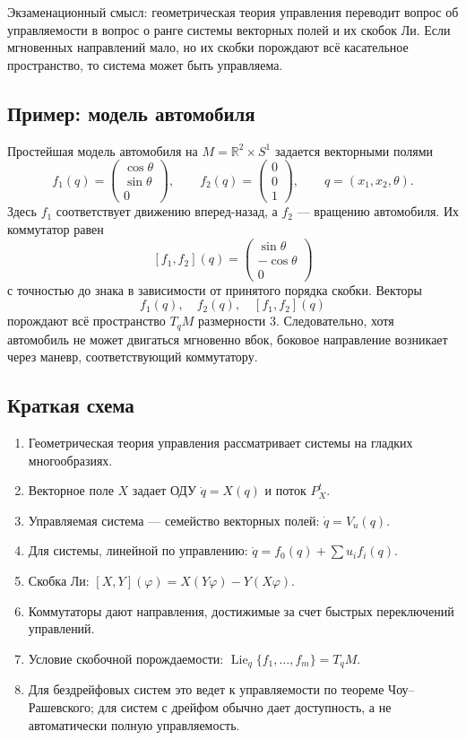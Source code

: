\documentclass[12pt,a4paper]{article}
\newcommand{\Lie}{\operatorname{Lie}}
\begin{document}
Экзаменационный смысл: геометрическая теория управления переводит вопрос об управляемости в вопрос о ранге системы векторных полей и их скобок Ли. Если мгновенных направлений мало, но их скобки порождают всё касательное пространство, то система может быть управляема.

\subsection*{Пример: модель автомобиля}
Простейшая модель автомобиля на $M=\mathbb R^2\times S^1$ задается векторными полями
\[
f_1(q)=
\begin{pmatrix}
\cos\theta\\
\sin\theta\\
0
\end{pmatrix},
\qquad
f_2(q)=
\begin{pmatrix}
0\\
0\\
1
\end{pmatrix},
\qquad q=(x_1,x_2,\theta).
\]
Здесь $f_1$ соответствует движению вперед-назад, а $f_2$ --- вращению автомобиля. Их коммутатор равен
\[
[f_1,f_2](q)=
\begin{pmatrix}
\sin\theta\\
-\cos\theta\\
0
\end{pmatrix}
\]
с точностью до знака в зависимости от принятого порядка скобки. Векторы
\[
f_1(q),\quad f_2(q),\quad [f_1,f_2](q)
\]
порождают всё пространство $T_qM$ размерности 3. Следовательно, хотя автомобиль не может двигаться мгновенно вбок, боковое направление возникает через маневр, соответствующий коммутатору.

\subsection*{Краткая схема}
\begin{enumerate}
    \item Геометрическая теория управления рассматривает системы на гладких многообразиях.
    \item Векторное поле $X$ задает ОДУ $\dot q=X(q)$ и поток $P_X^t$.
    \item Управляемая система --- семейство векторных полей: $\dot q=V_u(q)$.
    \item Для системы, линейной по управлению: $\dot q=f_0(q)+\sum u_i f_i(q)$.
    \item Скобка Ли: $[X,Y](\varphi)=X(Y\varphi)-Y(X\varphi)$.
    \item Коммутаторы дают направления, достижимые за счет быстрых переключений управлений.
    \item Условие скобочной порождаемости: $\Lie_q\{f_1,\ldots,f_m\}=T_qM$.
    \item Для бездрейфовых систем это ведет к управляемости по теореме Чоу--Рашевского; для систем с дрейфом обычно дает доступность, а не автоматически полную управляемость.
\end{enumerate}
\end{document}
